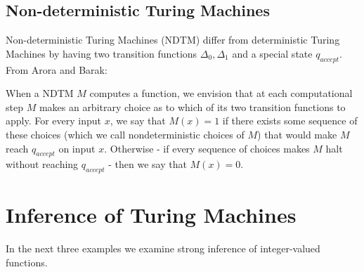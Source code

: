 \documentclass[11pt]{article}
\begin{document}
\subsection{Non-deterministic Turing Machines} 

Non-deterministic Turing Machines (NDTM) differ from deterministic Turing Machines by having two transition functions $ \Delta_0, \Delta_1 $ and a special state $ q_{accept} $. From Arora and Barak:

\begin{displayquote}
When a NDTM $M$ computes a function, we envision that at each computational step $ M $ makes an arbitrary choice as to which of its two transition functions to apply. For every input $ x $, we say that $ M(x) = 1 $ if there exists some sequence of these choices (which we call nondeterministic choices of $ M $) that would make $ M $ reach $ q_{accept} $ on input $ x $. Otherwise - if every sequence of choices makes $ M $ halt without reaching $ q_{accept} $ - then we say that $ M(x) = 0 $.
\end{displayquote}


\section{Inference of Turing Machines} 
 
 In the next three examples we examine strong inference of integer-valued functions. \\
 
\end{document}
